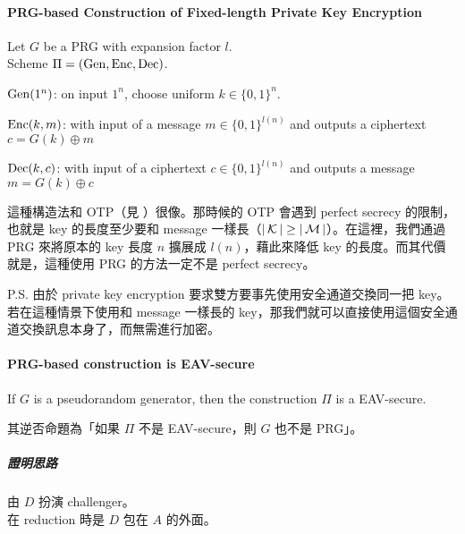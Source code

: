 \paragraph{PRG-based Construction of Fixed-length Private Key Encryption}

Let \(G\) be a PRG with expansion factor \(l\). \\
Scheme \(\Pi = (\operatorname{Gen}, \operatorname{Enc}, \operatorname{Dec})\).
\begin{myItemize}
	\item \(\operatorname{Gen}(1^n)\): on input \(1^n\), choose uniform \(k \in \{0, 1\}^n\).
	\item \(\operatorname{Enc}(k, m)\): with input of a message \(m \in \{0, 1\}^{l(n)}\) and outputs a ciphertext \(c = G(k) \oplus m\)
	\item \(\operatorname{Dec}(k, c)\): with input of a ciphertext \(c \in \{0, 1\}^{l(n)}\) and outputs a message \(m = G(k) \oplus c\)
\end{myItemize}

這種構造法和 OTP（見 ）很像。那時候的 OTP 會遇到 perfect secrecy 的限制，也就是 key 的長度至少要和 message 一樣長（\(|\operatorname{\mathcal{K}}| \geq |\operatorname{\mathcal{M}}|\)）。在這裡，我們通過 PRG 來將原本的 key 長度 \(n\) 擴展成 \(l(n)\)，藉此來降低 key 的長度。而其代價就是，這種使用 PRG 的方法一定不是 perfect secrecy。

P.S. 由於 private key encryption 要求雙方要事先使用安全通道交換同一把 key。若在這種情景下使用和 message 一樣長的 key，那我們就可以直接使用這個安全通道交換訊息本身了，而無需進行加密。


\paragraph{PRG-based construction is EAV-secure}

\begin{theorem}
	If \(G\) is a pseudorandom generator, then the construction \(\Pi\) is a EAV-secure.
\end{theorem}

其逆否命題為「如果 \(\Pi\) 不是 EAV-secure，則 \(G\) 也不是 PRG」。

\subparagraph{證明思路}

由 \(D\) 扮演 challenger。 \\
在 reduction 時是 \(D\) 包在 \(A\) 的外面。

\begin{figure}
\end{figure}

